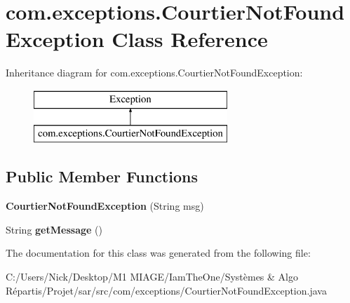 \hypertarget{classcom_1_1exceptions_1_1_courtier_not_found_exception}{}\section{com.\+exceptions.\+Courtier\+Not\+Found\+Exception Class Reference}
\label{classcom_1_1exceptions_1_1_courtier_not_found_exception}
Inheritance diagram for com.\+exceptions.\+Courtier\+Not\+Found\+Exception\+:\begin{figure}[H]
\begin{center}
\leavevmode
\includegraphics[height=2.000000cm]{classcom_1_1exceptions_1_1_courtier_not_found_exception}
\end{center}
\end{figure}
\subsection*{Public Member Functions}
\begin{DoxyCompactItemize}
\item 
\mbox{\label{classcom_1_1exceptions_1_1_courtier_not_found_exception_a90866e2d3c1d03a63ef5e50238ef0252}} 
{\bfseries Courtier\+Not\+Found\+Exception} (String msg)
\item 
\mbox{\label{classcom_1_1exceptions_1_1_courtier_not_found_exception_ada8c1148ac23a912559bc98d67295bca}} 
String {\bfseries get\+Message} ()
\end{DoxyCompactItemize}


The documentation for this class was generated from the following file\+:\begin{DoxyCompactItemize}
\item 
C\+:/\+Users/\+Nick/\+Desktop/\+M1 M\+I\+A\+G\+E/\+Iam\+The\+One/\+Systèmes \& Algo Répartis/\+Projet/sar/src/com/exceptions/Courtier\+Not\+Found\+Exception.\+java\end{DoxyCompactItemize}

